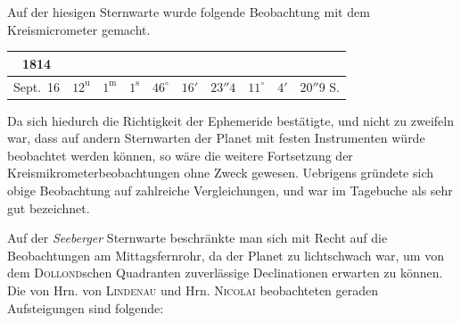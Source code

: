 \par\indent Auf der hiesigen Sternwarte wurde folgende Beobachtung mit dem Kreismicrometer gemacht.

\begin{center}\fontsize{9}{11}\selectfont\setlength{\tabcolsep}{3pt}\renewcommand{\arraystretch}{1.15}\begin{tabular}{c|ccc|ccc|ccc}
1814 &  &  &  \\
\hline
Sept.\ 16 & $12^{\mathrm u}$ & $1^{\mathrm m}$ & $1^{\mathrm s}$ & $46^{\circ}$ & $16'$ & $23''4$ & $11^{\circ}$ & $4'$ & $20''9$ S. \\
\end{tabular}\end{center}

\par\indent Da sich hiedurch die Richtigkeit der Ephemeride bestätigte, und nicht zu zweifeln war, dass
auf andern Sternwarten der Planet mit festen Instrumenten würde beobachtet werden können, so
wäre die weitere Fortsetzung der Kreismikrometerbeobachtungen ohne Zweck gewesen. Uebrigens
gründete sich obige Beobachtung auf zahlreiche Vergleichungen, und war im Tagebuche als sehr
gut bezeichnet.

\par\indent Auf der \emph{Seeberger} Sternwarte beschränkte man sich mit Recht auf die Beobachtungen am
Mittagsfernrohr, da der Planet zu lichtschwach war, um von dem \textsc{Dollond}schen Quadranten
zuverlässige Declinationen erwarten zu können. Die von Hrn. von \textsc{Lindenau} und Hrn.
\textsc{Nicolai} beobachteten geraden Aufsteigungen sind folgende:

